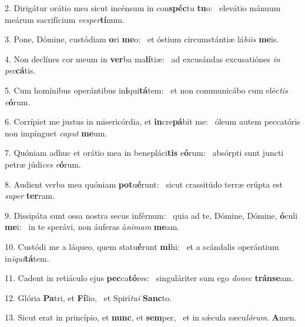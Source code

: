 2. Dirigátur orátio mea sicut incénsum in con\textbf{spéc}tu \textbf{tu}o: \ast\  elevátio mánuum meárum sacrifícium \textit{ves}\textit{per}\textbf{tí}num.\

3. Pone, Dómine, custódiam \textbf{o}ri \textbf{me}o: \ast\  et óstium circumstántiæ lá\textit{bi}\textit{is} \textbf{me}is.\

4. Non declínes cor meum in \textbf{ver}ba ma\textbf{lí}tiæ: \ast\  ad excusándas excusatiónes \textit{in} \textit{pec}\textbf{cá}tis.\

5. Cum homínibus operántibus in\textbf{i}qui\textbf{tá}tem: \ast\  et non communicábo cum eléc\textit{tis} \textit{e}\textbf{ó}rum.\

6. Corrípiet me justus in misericórdia, et \textbf{in}cre\textbf{pá}bit me: \ast\  óleum autem peccatóris non impínguet \textit{ca}\textit{put} \textbf{me}um.\

7. Quóniam adhuc et orátio mea in benepláci\textbf{tis} e\textbf{ó}rum: \ast\  absórpti sunt juncti petræ júdi\textit{ces} \textit{e}\textbf{ó}rum.\

8. Audient verba mea quóniam \textbf{pot}u\textbf{é}runt: \ast\  sicut crassitúdo terræ erúpta est \textit{su}\textit{per} \textbf{ter}ram.\

9. Dissipáta sunt ossa nostra secus inférnum: \dag\  quia ad te, Dómine, Dómine, \textbf{ó}culi \textbf{me}i: \ast\  in te sperávi, non áuferas á\textit{ni}\textit{mam} \textbf{me}am.\

10. Custódi me a láqueo, quem statu\textbf{é}runt \textbf{mi}hi: \ast\  et a scándalis operántium in\textit{i}\textit{qui}\textbf{tá}tem.\

11. Cadent in retiáculo ejus \textbf{pec}ca\textbf{tó}res: \ast\  singuláriter sum ego \textit{do}\textit{nec} \textbf{tráns}\textbf{e}am.\

12. Glória \textbf{Pa}tri, et \textbf{Fí}lio, \ast\  et Spirí\textit{tu}\textit{i} \textbf{Sanc}to.\

13. Sicut erat in princípio, et \textbf{nunc}, et \textbf{sem}per, \ast\  et in sǽcula sæcu\textit{ló}\textit{rum}. \textbf{A}men.\

